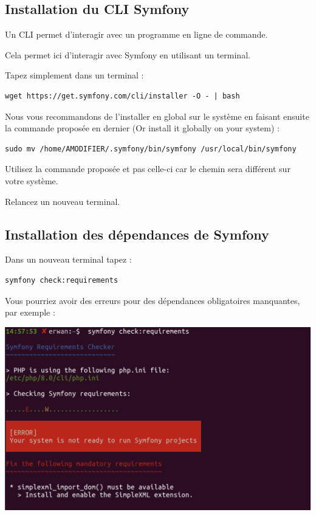 \documentclass{article}
\begin{document}
\subsection{Installation du CLI Symfony}
Un CLI permet d'interagir avec un programme en ligne de commande.

Cela permet ici d'interagir avec Symfony en utilisant un terminal.

Tapez simplement dans un terminal :
\begin{verbatim}
wget https://get.symfony.com/cli/installer -O - | bash
\end{verbatim}

Nous vous recommandons de l'installer en global sur le système en faisant ensuite la commande proposée en dernier (Or install it globally on your system) :
\begin{verbatim}
sudo mv /home/AMODIFIER/.symfony/bin/symfony /usr/local/bin/symfony
\end{verbatim}

Utilisez la commande proposée et pas celle-ci car le chemin sera différent sur votre système.

Relancez un nouveau terminal.

\subsection{Installation des dépendances de Symfony}
Dans un nouveau terminal tapez :
\begin{verbatim}
symfony check:requirements
\end{verbatim}

Vous pourriez avoir des erreurs pour des dépendances obligatoires manquantes, par exemple :
\begin{center}
\includegraphics[width=15cm]{images/image12.png}
\end{center}
\end{document}
